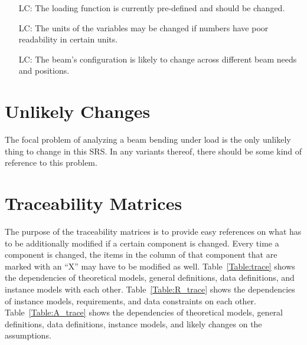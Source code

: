 \documentclass[12pt]{article}
\newcounter{lcnum} %
\begin{document}
\noindent\begin{itemize}

    \item[LC\refstepcounter{lcnum}\thelcnum\label{LC_loading}:] The loading
        function is currently pre-defined and should be changed.

    \item[LC\refstepcounter{lcnum}\thelcnum\label{LC_units}:] The units of the
        variables may be changed if numbers have poor readability in certain
        units.

    \item[LC\refstepcounter{lcnum}\thelcnum\label{LC_beam_configuration}:] The
        beam's configuration is likely to change across different beam needs and
        positions.

\end{itemize}


\section{Unlikely Changes}

The focal problem of analyzing a beam bending under load is the only unlikely
thing to change in this SRS. In any variants thereof, there should be some kind
of reference to this problem.


\section{Traceability Matrices}

The purpose of the traceability matrices is to provide easy references on what
has to be additionally modified if a certain component is changed.  Every time a
component is changed, the items in the column of that component that are marked
with an ``X'' may have to be modified as well.  Table~\ref{Table:trace} shows
the dependencies of theoretical models, general definitions, data definitions,
and instance models with each other. Table~\ref{Table:R_trace} shows the
dependencies of instance models, requirements, and data constraints on each
other. Table~\ref{Table:A_trace} shows the dependencies of theoretical models,
general definitions, data definitions, instance models, and likely changes on
the assumptions.
\end{document}
